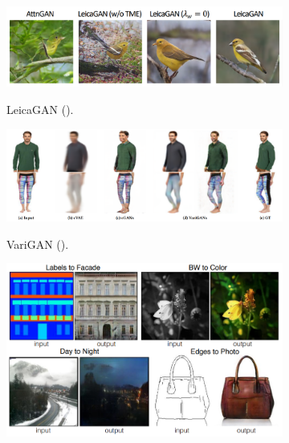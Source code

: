 \documentclass{article}
\begin{document}
\begin{figure}[h!]
\begin{subfigure}{0.45\textwidth}
\begin{center}
\begin{minipage}[t]{0.95\linewidth}
\begin{centering}
{\includegraphics[width=\linewidth]{leicagan.png}}
\caption{LeicaGAN (\cite{leica}).}
\label{fig:leica}
\end{centering}
\end{minipage}
\end{center}
\end{subfigure}
\begin{subfigure}{0.45\textwidth}
\begin{center}
\begin{minipage}[t]{0.825\linewidth}
\begin{centering}
{\includegraphics[width=\linewidth]{multi_view.png}}
\caption{VariGAN (\cite{multi_view}).}
\label{fig:multi_view}
\end{centering}
\end{minipage}
\end{center}
\end{subfigure}
\begin{subfigure}{0.45\textwidth}
\begin{center}
\begin{minipage}[t]{0.95\linewidth}
\begin{centering}
{\includegraphics[width=\linewidth]{pix2pix.png}}

\end{centering}
\end{minipage}
\end{center}
\end{subfigure}
\end{figure}
\end{document}
